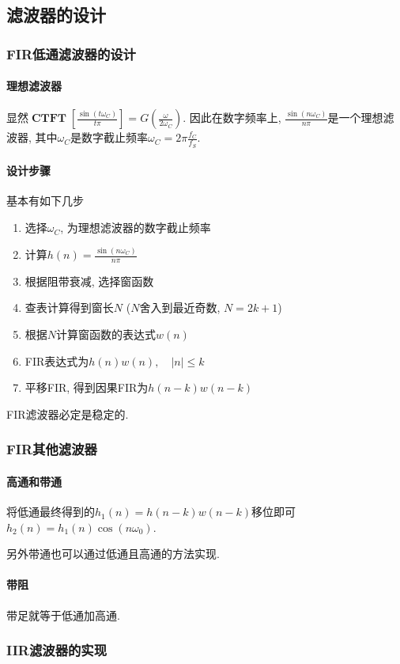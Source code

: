 \documentclass{ctexart}
\DeclareMathOperator{\CTFT}{\mathbf{CTFT}}
\begin{document}
\subsection{滤波器的设计}
\subsubsection{FIR低通滤波器的设计}
\paragraph{理想滤波器} 显然$\CTFT[\frac{\sin(t \omega_C)}{t \pi}] = G(\frac{\omega}{2\omega_C})$.
    因此在数字频率上, $\frac{\sin(n \omega_C)}{n \pi}$是一个理想滤波器,
    其中$\omega_C$是数字截止频率$\omega_C = 2\pi \frac{f_C}{f_S}$.
\paragraph{设计步骤} 基本有如下几步 \begin{enumerate}
        \item 选择$\omega_C$, 为理想滤波器的数字截止频率
        \item 计算$h(n) = \frac{\sin(n \omega_C)}{n \pi}$
        \item 根据阻带衰减, 选择窗函数
        \item 查表计算得到窗长$N$ ($N$舍入到最近奇数, $N = 2k +1$)
        \item 根据$N$计算窗函数的表达式$w(n)$
        \item FIR表达式为$h(n)w(n),\quad |n| \le k$
        \item 平移FIR, 得到因果FIR为$h(n-k)w(n-k)$
    \end{enumerate}
    FIR滤波器必定是稳定的.
\subsubsection{FIR其他滤波器}
\paragraph{高通和带通} 将低通最终得到的$h_1(n) = h(n-k)w(n-k)$移位即可$h_2(n) = h_1(n) \cos(n\omega_0)$.\par
    另外带通也可以通过低通且高通的方法实现.
\paragraph{带阻} 带足就等于低通加高通.
\subsubsection{IIR滤波器的实现}
\end{document}
